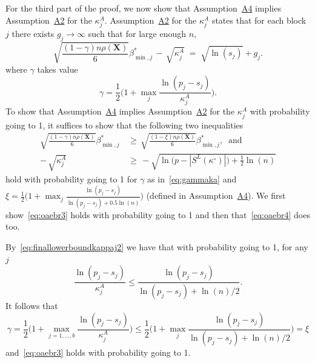 \documentclass[
  12pt]{article}
\newcommand{\bX}{\mathbf{X}}
\begin{document}
For the third part of the proof,
we now show that Assumption~\hyperlink{lab:A4}{A4} implies Assumption~\hyperlink{lab:A2}{A2} for the $\kappa^{A}_j$. Assumption~\hyperlink{lab:A2}{A2} for the $\kappa_j^{A}$ states that for each block $j$ there exists $g_j\to \infty$ such that for large enough $n$,
    \begin{equation*}
        \sqrt{\frac{(1-\gamma) n\rho(\bX)}{6}}{{\beta_{\min,j}^*}} \,- \,\sqrt{\kappa^{A}_j} \;=\; \sqrt{\ln(s_j)} + g_j .
    \end{equation*}
where $\gamma$ takes value
\begin{equation}\label{eq:gammaka}
    \gamma=\frac12\Big(1+\max_j\frac{\ln(p_j-s_j)}{\kappa^{A}_j}\Big).
\end{equation}
To show that Assumption~\hyperlink{lab:A4}{A4} implies Assumption~\hyperlink{lab:A2}{A2} for the $\kappa_j^{A}$ with probability going to 1, it suffices to show that the following two inequalities
\begin{align}
    \sqrt{\frac{ (1-\gamma)n\rho(\bX)}{6}}{\beta_{\min,j}^*} \,&\geq \,  \sqrt{\frac{ (1-\xi)n\rho(\bX)}{6}}{\beta_{\min,j}^*}, \label{eq:oaebr3}\;\;\text{and} \\
    - \,\sqrt{\kappa^{A}_j} \,&\geq \,-\sqrt{\ln\bigg(p-|S^{L}(\kappa^{\circ})|\bigg)+\frac12\ln(n)}\label{eq:oaebr4}
\end{align}
hold with probability going to 1 for $\gamma$ as in~\eqref{eq:gammaka} and $\xi=\frac12\big(1+\max_j \frac{\ln(p_j-s_j)}{\ln(p_j-s_j)+0.5\ln(n)}\big)$ (defined in Assumption~\hyperlink{lab:A4}{A4}). We first show~\eqref{eq:oaebr3} holds with probability going to 1 and then that~\eqref{eq:oaebr4} does too.

By~\eqref{eq:finallowerboundkappaj2} we have that with probability going to 1, for any $j$
\begin{equation*}
\frac{\ln(p_j-s_j)}{\kappa^{A}_j} 
    \leq  \frac{\ln(p_j-s_j)}{\ln(p_j-s_j)+\ln(n)/2}.
\end{equation*}
It follows that
\begin{equation*}
    \gamma=\frac12\Big(1+\max_{j=1, \ldots,b}\frac{\ln(p_j-s_j)}{\kappa^ A_j}\Big) \leq \frac12\big(1+\max_j \frac{\ln(p_j-s_j)}{\ln(p_j-s_j)+\ln(n)/2}\big)=\xi
\end{equation*}
and~\eqref{eq:oaebr3} holds with probability going to 1.
\end{document}
